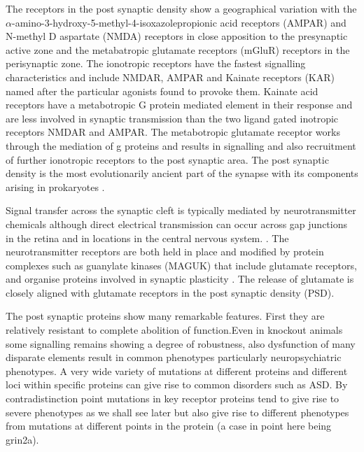  The receptors in the post synaptic density show a geographical variation with the  $\alpha$-amino-3-hydroxy-5-methyl-4-isoxazolepropionic acid  receptors (AMPAR) and N-methyl D aspartate (NMDA) receptors in close apposition to the presynaptic active zone and the metabatropic glutamate receptors (mGluR) receptors in the perisynaptic zone.\cite{scheefhals2018functional} The ionotropic receptors have the fastest signalling characteristics and include NMDAR, AMPAR and Kainate receptors (KAR) named after the particular agonists found to provoke them. Kainate acid receptors have a metabotropic G protein mediated element in their response and are less involved in synaptic transmission \cite{contractor2011kainate} than the two ligand gated inotropic receptors NMDAR and AMPAR.  The metabotropic glutamate receptor works through the mediation of g proteins and results in signalling and also recruitment of further ionotropic receptors to the post synaptic area. The post synaptic density is the most evolutionarily ancient part of the synapse with its components arising in prokaryotes\cite{grant2018synapse} \cite{emes2012evolution}. 

Signal transfer across the synaptic cleft is typically mediated by neurotransmitter chemicals although direct electrical transmission can occur across gap junctions in the retina and in locations in the central nervous system.  \cite{stewart2014structure}. The neurotransmitter receptors are both held in place and modified by protein complexes such as guanylate kinases (MAGUK) that include glutamate receptors, and organise proteins involved in synaptic plasticity \cite{zhu2016mechanistic}. The release of glutamate is closely aligned with glutamate receptors in the post synaptic density (PSD). \cite{harris2012ultrastructure}




The post synaptic proteins show many remarkable features. First they are relatively resistant to complete abolition of function.Even in knockout animals some signalling remains showing a degree of robustness, also dysfunction of many disparate elements result in common phenotypes particularly neuropsychiatric phenotypes. A very wide variety of mutations at different proteins and different loci within specific proteins can give rise to common disorders such as ASD. By contradistinction point mutations in key receptor proteins tend to give rise to severe phenotypes as we shall see later but also give rise to different phenotypes from mutations at different points in the protein (a case in point here being grin2a).

